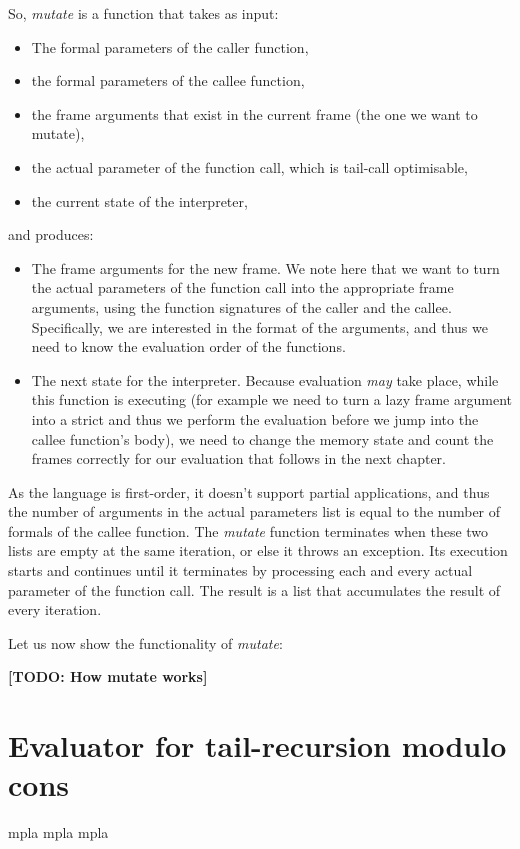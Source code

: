 \documentclass[diploma]{softlab-thesis}
\begin{document}
So, \textit{mutate} is a function that takes as input:
\begin{itemize}
  \item The formal parameters of the caller function,
  \item the formal parameters of the callee function,
  \item the frame arguments that exist in the current frame (the one we want to mutate),
  \item the actual parameter of the function call, which is tail-call optimisable,
  \item the current state of the interpreter, 
\end{itemize}
and produces:
\begin{itemize}
  \item The frame arguments for the new frame. We note here that we want to turn the actual parameters 
  of the function call into the appropriate frame arguments, using the function signatures of the caller and the callee.
  Specifically, we are interested in the format of the arguments, and thus we need to know the evaluation 
  order of the functions.
  \item The next state for the interpreter. Because evaluation \textit{may} take place, while this function is executing 
  (for example we need to turn a lazy frame argument into a strict and thus we perform the evaluation before 
  we jump into the callee function's body), we need to change the memory state and count the frames correctly
  for our evaluation that follows in the next chapter.
\end{itemize}

As the language is first-order, it doesn't support partial applications, and thus the number of arguments 
in the actual parameters list is equal to the number of formals of the callee function. The \textit{mutate} function 
terminates when these two lists are empty at the same iteration, or else it throws an exception. Its execution starts 
and continues until it terminates by processing each and every actual parameter of the function call. The result is 
a list that accumulates the result of every iteration. 
\newline
\par Let us now show the functionality of \textit{mutate}:

\textbf{[TODO: How mutate works]}


\section {Evaluator for tail-recursion modulo cons}
mpla mpla mpla 
\end{document}
